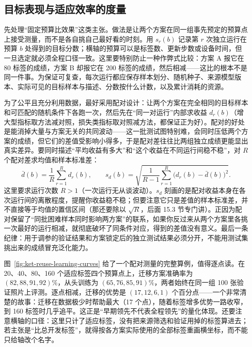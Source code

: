 \subsection{目标表现与适应效率的度量}
\label{sec:ket-evaluation-target}

先处理“固定预算比效果”这类主张。做法是让两个方案在同一组事先预定的预算点上接受测量，而不是各自挑自己最好看的时刻。用 $s_r(b)$ 记录第 $r$ 次独立运行在预算 $b$ 处得到的目标分数；横轴的预算可以是标签数、更新步数或设备时间，但一旦选定就必须全程口径一致。这里要特别防止一种作弊式比较：方案 A 报它在 80 标签的成绩，方案 B 却报它在 200 标签的成绩，然后相减——这比的根本不是同一件事。为保证可复查，每次运行都应保存样本划分、随机种子、来源模型版本、实际可见的目标样本与描述、分数按什么计数，以及累计消耗的资源。

为了公平且充分利用数据，最好采用配对设计：让两个方案在完全相同的目标样本和可匹配的随机条件下各跑一次，然后先在“同一对运行”内部求收益 $d_r(b)$（增大型指标取方法减对照，损失类指标取对照减方法，都保证正为好）。配对的好处是能消掉大量与方案无关的共同波动——这一批测试图特别难，会同时压低两个方案的成绩，但它们的差值受影响小得多，于是配对差往往比两组独立成绩更能显出真实差异。要同时描述“平均收益有多大”和“这个收益在不同运行间稳不稳”，对 $R$ 个配对差求均值和样本标准差：
\begin{equation}
  \bar d(b)=\frac1R\sum_{r=1}^{R}d_r(b),\qquad
  s_d(b)=\sqrt{\frac{1}{R-1}
    \sum_{r=1}^{R}\bigl(d_r(b)-\bar d(b)\bigr)^2}.
  \label{eq:ket-evaluation-run-summary}
\end{equation}
这里要求运行次数 $R>1$（一次运行无从谈波动）。$s_d$ 刻画的是配对收益本身在各次运行间的离散程度，提醒你收益稳不稳；但要注意它只是差值的样本标准差，并不直接等于均值的置信区间（那还要除以 $\sqrt R$，后面 15.3 节专门讲）。正因为配对保留了“同批困难样本同时影响两方案”的联系，如果你反过来从两个方案里各挑一次最好的运行相减，就彻底破坏了同条件对应，得到的差值没有意义。最后一条纪律：用于调参的验证结果和方案锁定后的独立测试结果必须分开，不能用测试集挑出来的成绩冒充泛化能力。

图~\ref{fig:ket-reuse-learning-curves} 给了一个配对测量的完整算例，值得逐点读。在 20、40、80、160 个适应标签四个预算点上，迁移方案准确率为 $(82,88,91,92)\%$，从头训练为 $(65,76,85,91)\%$，两者始终在同一组 100 张验证照片上评测。逐点相减，迁移的优势是 $(17,12,6,1)$ 个百分点——一个非常清楚的故事：迁移在数据极少时帮助最大（17 个点），随着标签增多优势一路收窄，到 160 标签时几乎追平。这正是“早期领先不代表全程领先”的量化体现。还要注意横轴的口径：这里只计了适应标签，没有把来源筛选和验证用掉的标签算进去；若主张是“比总开发标签”，就得按各方案实际使用的全部标签重画横坐标，而不能只给轴改个名字。

